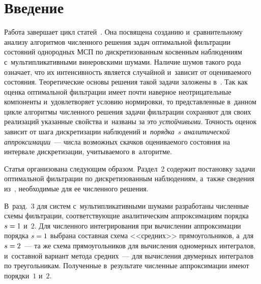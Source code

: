 
 



\thispagestyle{headings}

\begin{multicols}{2}

\label{st\stat}


 \section{Введение}

Работа завершает цикл статей~\cite{B_20_1_IA, B_20_2_IA}. Она посвящена 
созданию и~сравнительному анализу алгоритмов численного решения задач 
оптимальной фильтрации состояний однородных МСП
 по дискретизованным косвенным наблюдениям 
с~мультипликативными винеровскими шумами. Наличие шумов такого рода 
означает, что их интенсивность является случайной и~зависит от 
оцениваемого со\-сто\-яния. Тео\-ре\-ти\-че\-ские основы решения такой задачи 
заложены в~\cite{B_18, B_18_IA}. Так как оценка оптимальной фильтрации 
имеет почти наверное неотрицательные компоненты и~удовлетворяет условию 
нормировки, то пред\-став\-лен\-ные в~данном цикле алгоритмы чис\-лен\-но\-го решения 
задачи фильтрации сохраняют для своих реализаций указанные свойства 
и~названы за это \textit{устойчивыми}.
Точность оценок зависит от шага дискретизации наблюдений 
и~\textit{порядка~$s$ аналитической аппроксимации}~--- числа возможных скачков 
оцениваемого состояния на интервале дискретизации, учитываемого 
в~алгоритме.


Статья организована следующим образом. 
%
Раздел~2 содержит постановку 
задачи оптимальной фильтрации по дискретизованным наблюдениям, а~также 
сведения из~\cite{B_20_1_IA, B_20_2_IA}, необходимые для ее чис\-лен\-но\-го 
решения. 

В~разд.~3 для систем с~мультипликативными шумами разработаны 
численные схемы фильтрации, соответствующие аналитическим аппроксимациям 
порядка $s\hm=1$ и~$2$.
Для численного интегрирования при вычислении аппроксимации порядка 
$s\hm=1$ выбрана составная схема <<средних>> прямоугольников, а~для 
$s\hm=2$~--- та же схема прямоугольников для вычисления одномерных 
интегралов, и~составной вариант метода средних~--- для вычисления 
двумерных интегралов по треугольникам. 
Полученные в~результате чис\-лен\-ные 
аппроксимации имеют порядки~$1$ и~$2$. 


\end{multicols}
